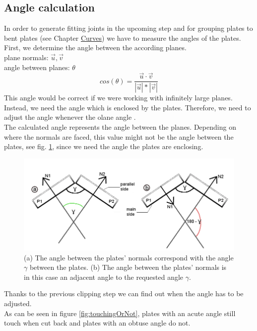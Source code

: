 \documentclass[../ClassicThesis.tex]{subfiles}
\begin{document}
\subsection{Angle calculation}\label{angleCalculation}
In order to generate fitting joints in the upcoming step and for grouping plates to bent plates (see Chapter \hyperref[ch:curves]{Curves}) we have to measure the angles of the plates.\\
First, we determine the angle between the according planes.\\
plane normals: $\vec{u}, \vec{v}$\\
angle between planes: $\theta$
$$ cos(\theta) = \frac{\vec{u} \cdot \vec{v}}{|\vec{u}| * |\vec{v}|}$$
This angle would be correct if we were working with infinitely large planes. Instead, we need the angle which is enclosed by the plates. Therefore, we need to adjust the angle whenever the olane angle .\\
The calculated angle represents the angle between the planes. Depending on where the normals are faced, this value might not be the angle between the plates, see fig. \ref{fig:wrongAngle}, since we need the angle the plates are enclosing.
\begin{figure}[!ht]
\centering
\includegraphics[width= 1\columnwidth]{Images/anglesExamplesSmall.png}
\caption{(a) The angle between the plates' normals correspond with the angle $\gamma$ between the plates. (b) The angle between the plates' normals is in this case an adjacent angle to the requested angle $\gamma$.}
\label{fig:wrongAngle}
\end{figure}
Thanks to the previous clipping step we can find out when the angle has to be adjusted.\\
As can be seen in figure \ref{fig:touchingOrNot}, plates with an acute angle still touch when cut back and plates with an obtuse angle do not.
\end{document}
